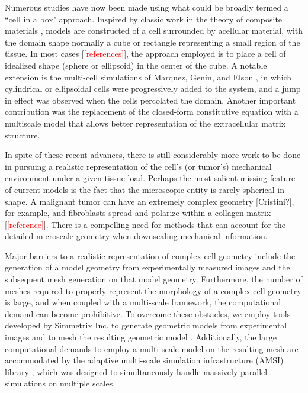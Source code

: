 \documentclass[]{interact}
\newcommand{\red}[1]{\textcolor{red}{[#1]}}
\begin{document}
Numerous studies have now been made using what could be broadly termed a ``cell in a box" approach. Inspired by classic work in the theory of composite materials \citep{Hashin:1962tm}, models are constructed of a cell surrounded by acellular material, with the domain shape normally a cube or rectangle representing a small region of the tissue.  In most cases [\red{references}], the approach employed is to place a cell of idealized shape (sphere or ellipsoid) in the center of the cube. A notable extension is the multi-cell simulations of Marquez, Genin, and Elson \citep{Marquez:2006gv}, in which cylindrical or ellipsoidal cells were progressively added to the system, and a jump in effect was observed when the cells percolated the domain.  Another important contribution \citep{Lai:2013fp} was the replacement of the closed-form constitutive equation with a multiscale model that allows better representation of the extracellular matrix structure.

In spite of these recent advances, there is still considerably more work to be done in pursuing a realistic representation of the cell's (or tumor's) mechanical environment under a given tissue load. Perhaps the most salient missing feature of current models is the fact that the microscopic entity is rarely spherical in shape.  A malignant tumor can have an extremely complex geometry [Cristini?], for example, and fibroblasts spread and polarize within a collagen matrix [\red{reference}]. There is a compelling need for methods that can account for the detailed microscale geometry when downscaling mechanical information.

Major barriers to a realistic representation of complex cell geometry include the generation of a model geometry from experimentally measured images and the subsequent mesh generation on that model geometry. Furthermore, the number of meshes required to properly represent the morphology of a complex cell geometry is large, and when coupled with a multi-scale framework, the computational demand can become prohibitive. To overcome these obstacles, we employ tools developed by Simmetrix Inc. \citep{simmetrix} to generate geometric models from experimental images \citep{Klaas_conference, Klaas:2013ug} and to mesh the resulting geometric model \citep{Shephard:2000vc}. Additionally, the large computational demands to employ a multi-scale model on the resulting mesh are accommodated by the adaptive multi-scale simulation infrastructure (AMSI) library \citep{Delalondre:2010kt,Tobin:2017ip}, which was designed to simultaneously handle massively parallel simulations on multiple scales.
\end{document}
